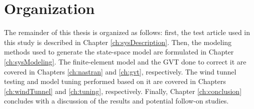 \section{Organization} %

The remainder of this thesis is organized as follows: first, the test article used in this study is described in Chapter \ref{ch:sysDescription}. Then, the modeling methods used to generate the state-space model are formulated in Chapter \ref{ch:sysModeling}. The finite-element model and the GVT done to correct it are covered in Chapters \ref{ch:nastran} and \ref{ch:gvt}, respectively. The wind tunnel testing and model tuning performed based on it are covered in Chapters \ref{ch:windTunnel} and \ref{ch:tuning}, respectively. Finally, Chapter \ref{ch:conclusion} concludes with a discussion of the results and potential follow-on studies.